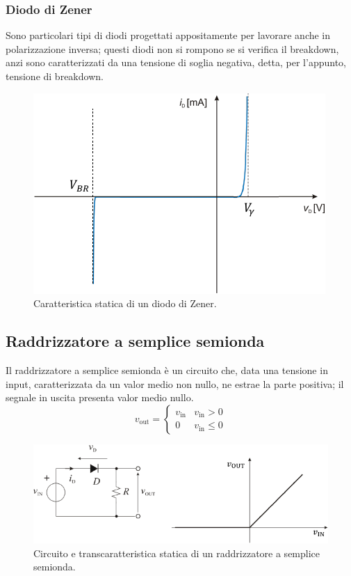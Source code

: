 \documentclass[a4paper]{article}
\begin{document}
			\subsubsection{Diodo di Zener}
				Sono particolari tipi di diodi progettati appositamente per lavorare anche in polarizzazione inversa; questi diodi non si rompono se si verifica il breakdown, anzi sono caratterizzati da una tensione di soglia negativa, detta, per l'appunto, tensione di breakdown.
				\begin{figure}[h!]
					\centering
					\includegraphics[scale=0.7]{caratteristicaStaticaDiodoZener}
					\caption{Caratteristica statica di un diodo di Zener.}
					\label{fig:caratteristicaStaticaDiodoZener}
				\end{figure}
		\subsection{Raddrizzatore a semplice semionda}
			Il raddrizzatore a semplice semionda è un circuito che, data una tensione in input, caratterizzata da un valor medio non nullo, ne estrae la parte positiva; il segnale in uscita presenta valor medio nullo.
			\begin{equation*}
				v_{\mathrm{out}} =
				\begin{cases}
					v_{\mathrm{in}} & v_{\mathrm{in}} > 0 \\
					0 				& v_{\mathrm{in}} \le 0
				\end{cases}
			\end{equation*}
			\begin{figure}[h!]
				\centering
				\includegraphics[scale=0.7]{transcaratteristicaStaticaRaddrizzatoreASempliceSemionda}
				\caption{Circuito e transcaratteristica statica di un raddrizzatore a semplice semionda.}
				\label{fig:transcaratteristicaStaticaRaddrizzatoreASempliceSemionda}
			\end{figure}
\end{document}
